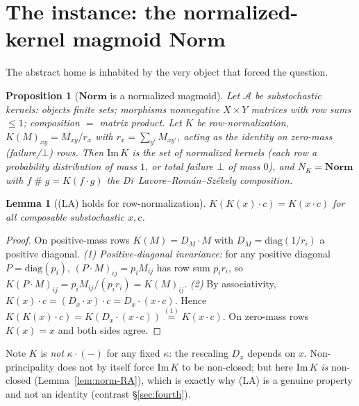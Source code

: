 \documentclass[11pt]{amsart}
\theoremstyle{plain}
\newtheorem{proposition}[theorem]{Proposition}
\newtheorem{lemma}[theorem]{Lemma}
\theoremstyle{definition}
\theoremstyle{remark}
\newcommand{\Norm}{\mathbf{Norm}}
\newcommand{\Img}{\mathrm{Im}\,}
\newcommand{\sh}{\mathbin{\#}}
\newcommand{\LA}{\textsf{(LA)}}
\begin{document}
\section{The instance: the normalized-kernel magmoid \texorpdfstring{$\Norm$}{Norm}}
\label{sec:instance}

The abstract home is inhabited by the very object that forced the question.

\begin{proposition}[$\Norm$ is a normalized magmoid]
\label{prop:norm-instance}
Let $\mathcal{A}$ be substochastic kernels: objects finite sets; morphisms nonnegative $X\times Y$
matrices with row sums $\le 1$; composition $=$ matrix product. Let $K$ be row-normalization,
$K(M)_{xy}=M_{xy}/r_{x}$ with $r_{x}=\sum_{y'}M_{xy'}$, acting as the identity on zero-mass
(failure/$\bot$) rows. Then $\Img K$ is the set of normalized kernels (each row a probability
distribution of mass $1$, or total failure $\bot$ of mass $0$), and $N_{K}=\Norm$ with
$f\sh g=K(f\cdot g)$ the Di~Lavore--Rom\'an--Sz\'ekely composition.
\end{proposition}

\begin{lemma}[\LA{} holds for row-normalization]
\label{lem:norm-LA}
$K(K(x)\cdot c)=K(x\cdot c)$ for all composable substochastic $x,c$.
\end{lemma}
\begin{proof}
On positive-mass rows $K(M)=D_{M}\cdot M$ with $D_{M}=\mathrm{diag}(1/r_{i})$ a positive diagonal.
\emph{(1) Positive-diagonal invariance:} for any positive diagonal $P=\mathrm{diag}(p_{i})$,
$(P\cdot M)_{ij}=p_{i}M_{ij}$ has row sum $p_{i}r_{i}$, so
$K(P\cdot M)_{ij}=p_{i}M_{ij}/(p_{i}r_{i})=K(M)_{ij}$. \emph{(2)} By associativity,
$K(x)\cdot c=(D_{x}\cdot x)\cdot c=D_{x}\cdot(x\cdot c)$. Hence
$K(K(x)\cdot c)=K(D_{x}\cdot(x\cdot c))\overset{(1)}{=}K(x\cdot c)$. On zero-mass rows $K(x)=x$ and
both sides agree.
\end{proof}

Note $K$ is \emph{not} $\kappa\cdot(-)$ for any fixed $\kappa$: the rescaling $D_{x}$ depends on
$x$. Non-principality does not by itself force $\Img K$ to be non-closed; but here $\Img K$
\emph{is} non-closed (Lemma~\ref{lem:norm-RA}), which is exactly why \LA{} is a genuine property and
not an identity (contrast \S\ref{sec:fourth}).
\end{document}
